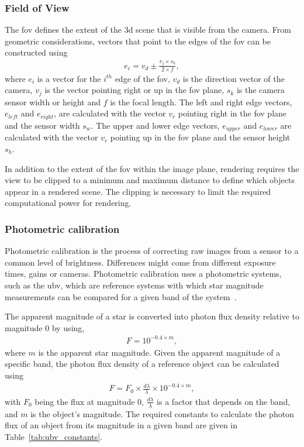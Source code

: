 \subsubsection{Field of View}
The \gls{fov} defines the extent of the \gls{3d} scene that is visible from the camera. From geometric considerations, vectors that point to the edges of the \gls{fov} can be constructed using
\begin{align}
    e_{i} = v_d \pm \frac{v_j \times s_k}{2 \times f}, \label{eq:fov_edge}
\end{align}
where $e_{i}$ is a vector for the $i^{th}$ edge of the \gls{fov}, $v_d$ is the direction vector of the camera, $v_j$ is the vector pointing right or up in the \gls{fov} plane, $s_k$ is the camera sensor width or height and $f$ is the focal length. The left and right edge vectors, $e_{left}$ and $e_{right}$, are calculated with the vector $v_r$ pointing right in the \gls{fov} plane and the sensor width $s_w$. The upper and lower edge vectors, $e_{upper}$ and $e_{lower}$  are calculated with the vector $v_r$ pointing up in the \gls{fov} plane and the sensor height $s_h$.

In addition to the extent of the \gls{fov} within the image plane, rendering requires the view to be clipped to a minimum and maximum distance to define which objects appear in a rendered scene. The clipping is necessary to limit the required computational power for rendering. 

\subsubsection{Photometric calibration} \label{sec:photo_cal}
Photometric calibration is the process of correcting raw images from a sensor to a common level of brightness. Differences might come from different exposure times, gains or cameras. Photometric calibration uses a photometric systems, such as the \gls{ubv}, which are reference systems with which star magnitude measurements can be compared for a given band of the system~\cite{Bessell1979UBVRIPhotometry}.

The apparent magnitude of a star is converted into photon flux density relative to magnitude 0 by using,
\begin{align}
    F = 10^{-0.4 \times m}, \label{eq:mag_flux}
\end{align}
where $m$ is the apparent star magnitude. 
Given the apparent magnitude of a specific band, the photon flux density of a reference object can be calculated using
\begin{align}
    F = F_0 \times \frac{d\lambda}{\lambda} \times 10^{-0.4 \times m}, \label{eq:comp_flux_0mag}
\end{align}
with $F_0$ being the flux at magnitude 0, $\frac{d\lambda}{\lambda}$ is a factor that depends on the band, and $m$ is the object's magnitude. The required constants to calculate the photon flux of an object from its magnitude in a given band are given in Table~\ref{tab:ubv_constants}.

